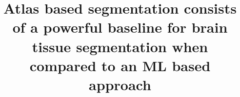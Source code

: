 \documentclass[conference]{IEEEtran}
\begin{document}
\title{Atlas based segmentation consists of a powerful baseline for brain tissue segmentation when compared to an ML based approach}

\author{
\and
{}
\and
{}
}

\maketitle

\begin{abstract}

\end{abstract}

\begin{IEEEkeywords}
\end{IEEEkeywords}

% 






\end{document}
